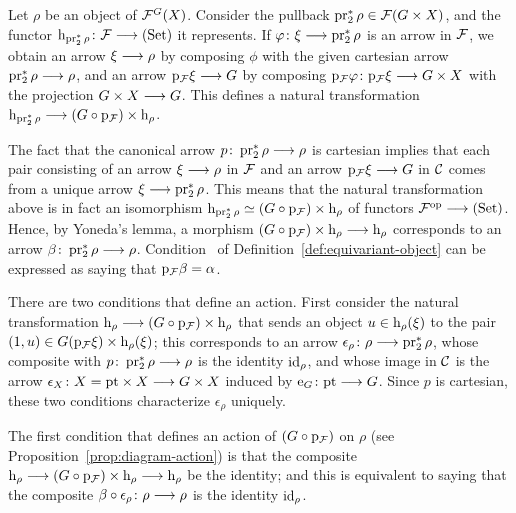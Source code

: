 \begin{3   FIBERED CATEGORIES}
\begin{3.8 Equivariant objects in fibcats}
Let $\rho$ be an object of $\mathcal{F}^{G}(X)$. Consider the pullback $\operatorname{pr}_2^*\rho \in \mathcal{F}(G \times X)$, and the functor $\h_{\pr_2^*\rho} \colon \cF \arr \catset$ it represents. If $\phi \colon \xi \arr \pr_2^* \rho$ is an arrow in $\mathcal{F}$, we obtain an arrow $\xi \arr \rho$ by composing $\phi$ with the given cartesian arrow $\pr_2^* \rho \arr \rho$, and an arrow $\p_{\cF}\xi \arr G$ by composing $\p_{\cF}\phi \colon \p_{\cF} \xi \arr G \times X$ with the projection $G \times X \arr G$. This defines a natural transformation $\h_{\pr_2^*\rho} \arr (G \circ \p_{\cF}) \times \h_\rho$.

The fact that the canonical arrow $p \colon \pr_2^* \rho \arr \rho$ is cartesian implies that each pair consisting of an arrow $\xi \arr \rho$ in $\mathcal{F}$ and an arrow $\p_{\cF}\xi \arr G$ in $\mathcal{C}$ comes from a unique arrow $\xi \arr \pr_{2}^{*}\rho$. This means that the natural transformation above is in fact an isomorphism $\mathrm{h}_{\operatorname{pr}_2^*\rho} \simeq (G \circ \mathrm{p}_{\mathcal{F}}) \times \mathrm{h}_\rho$ of functors $\cF\op \arr \catset$. Hence, by Yoneda's lemma, a morphism $(G \circ \p_{\cF}) \times \h_\rho \arr \h_\rho$ corresponds to an arrow $\beta\colon \pr_2^*\rho \arr \rho$. Condition~ of Definition~\ref{def:equivariant-object} can be expressed as saying that $\mathrm{p}_{\mathcal{F}}\beta = \alpha$.

There are two conditions that define an action. First consider the natural transformation $\h_{\rho} \arr (G \circ \p_{\cF}) \times \h_{\rho}$ that sends an object $u \in  \mathrm{h}_{\rho}(\xi)$ to the pair $(1, u) \in G(\mathrm{p}_{\mathcal{F}}\xi) \times \mathrm{h}_{\rho}(\xi)$; this corresponds to an arrow $\epsilon_{\rho} \colon \rho \arr \pr_{2}^{*}\rho$, whose composite with $p \colon  \pr_{2}^{*}\rho \arr \rho$ is the identity $\mathrm{id}_{\rho}$, and whose image in $\mathcal{C}$ is the arrow $\epsilon_{X}\colon X = \pt \times X \arr G \times X$ induced by $\iden_{G} \colon \pt \arr G$. Since $p$ is cartesian, these two conditions characterize $\epsilon_{\rho}$ uniquely.

The first condition that defines an action of $(G \circ \mathrm{p}_{\mathcal{F}})$ on $\rho$ (see Proposition~\ref{prop:diagram-action}) is that the composite $\h_{\rho} \arr (G \circ \p_{\cF}) \times \h_{\rho} \arr \h_{\rho}$ be the identity; and this is equivalent to saying that the composite $\beta \circ \epsilon_{\rho} \colon \rho \arr \rho$ is the identity $\mathrm{id}_{\rho}$.


\end{3.8 Equivariant objects in fibcats}
\end{3   FIBERED CATEGORIES}
